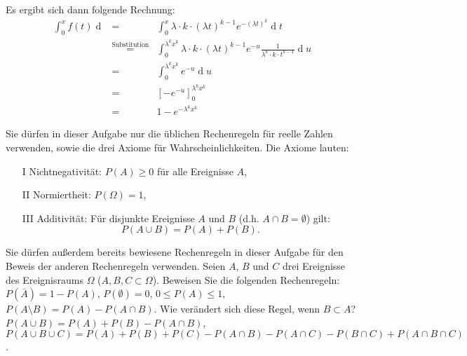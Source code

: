 \begin{Answer}
Es ergibt sich dann folgende Rechnung:
\begin{eqnarray*}
	\int_0^{x}f(t)\operatorname{d}&=&\int_{0}^{x}\lambda\cdot k\cdot (\lambda t)^{k-1}e^{-(\lambda t)^k}\operatorname{d}t\\
	&\stackrel{\text{Substitution}}{=}&\int_0^{\lambda^kx^k} \lambda\cdot k\cdot (\lambda t)^{k-1}e^{-u}\frac{1}{\lambda^k\cdot k\cdot t^{k-1}}\operatorname{d}u\\
	&=&\int_0^{\lambda^kx^k}e^{-u}\operatorname{d}u\\
	&=&\left[-e^{-u}\right]_0^{\lambda^kx^k}\\
	&=&1-e^{-\lambda^kx^k}
\end{eqnarray*}
\end{Answer}


\begin{Exercise} Sie dürfen in dieser Aufgabe nur die üblichen Rechenregeln für reelle Zahlen verwenden, sowie die drei Axiome für Wahrscheinlichkeiten. Die Axiome lauten:
	\begin{itemize}
		\item[I]  Nichtnegativität: $P(A)\geq0$ für alle Ereignisse $A$,
		\item[II] Normiertheit: $P(\Omega)=1$,
		\item[III] Additivität: Für disjunkte Ereignisse $A$ und $B$ (d.h. $A\cap B=\emptyset$) gilt:
		\begin{equation*}
			P(A\cup B)=P(A)+P(B).
		\end{equation*}
	\end{itemize}
	Sie dürfen außerdem bereits bewiesene Rechenregeln in dieser Aufgabe für den Beweis der anderen Rechenregeln verwenden.
	Seien $A$, $B$ und $C$ drei Ereignisse des Ereignisraums $\Omega$ ($A,B,C\subset \Omega$). 
	Beweisen Sie die folgenden Rechenregeln:
	\Question $P(\overline{A})=1-P(A)$,
	\Question $P(\emptyset)=0$,
	\Question $0\leq P(A)\leq1$,
	\Question $P(A\setminus B)=P(A)-P(A\cap B)$. Wie verändert sich diese Regel, wenn $B\subset A$?
	\Question $P(A\cup B)=P(A)+P(B)-P(A\cap B)$,
	\Question $P(A \cup B \cup C )=P(A)+P(B)+P(C)-P(A\cap B)-P(A\cap C)-P(B\cap C)+P(A\cap B\cap C)$.
\end{Exercise}

